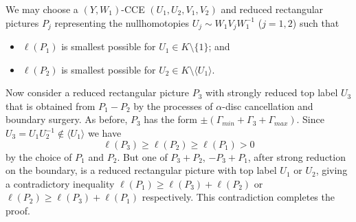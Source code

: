 \documentclass[12pt,a4paper]{amsart}
\def\<{\langle}
\def\>{\rangle}
\def\G{\Gamma}
\def\a{\alpha}
\begin{document}
We may choose a $(Y,W_1)$-CCE $(U_1,U_2,V_1,V_2)$ and reduced rectangular pictures $P_j$ representing the nullhomotopies $U_j\sim W_1V_jW_1^{-1}$ ($j=1,2$) such that 
\begin{itemize} 
\item $\ell(P_1)$ is smallest possible for $U_1\in K\setminus \{1\}$; and
\item $\ell(P_2)$ is smallest possible for $U_2\in K\setminus\<U_1\>$.
\end{itemize}




Now consider a reduced rectangular picture $P_3$ with strongly reduced top label $U_3$ that is obtained from $P_1-P_2$ by the processes of $\a$-disc cancellation and boundary surgery.  
As before,  $P_3$ has the form  $\pm(\G_{min}+\G_3+\G_{max})$. 
Since  $U_3=U_1U_2^{-1}\notin \<U_1\>$ we have $$\ell(P_3)\ge \ell(P_2)\ge\ell(P_1)>0$$ by the choice of $P_1$ and $P_2$.
But one of $P_3+P_2$, $-P_3+P_1$, after strong reduction on the boundary, 
is a reduced rectangular picture with top label $U_1$ or $U_2$, giving a contradictory inequality 
$\ell(P_1)\ge \ell(P_3)+\ell(P_2)$ or $\ell(P_2)\ge\ell(P_3)+\ell(P_1)$ respectively.  
This contradiction completes the proof.
\end{document}
